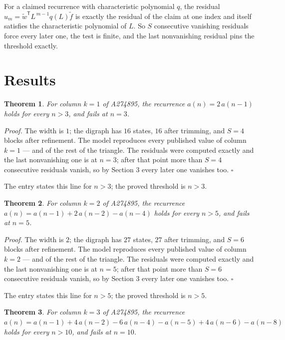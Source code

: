 \documentclass[11pt]{article}
\newtheorem{theorem}{Theorem}
\theoremstyle{definition}
\begin{document}
For a claimed recurrence with characteristic polynomial $q$, the residual $u_m = \tilde w^{\mathsf T}L^{\,m-1}q(L)\tilde f$ is exactly the residual of the claim at one index and itself satisfies the characteristic polynomial of $L$. So $S$ consecutive vanishing residuals force every later one, the test is finite, and the last nonvanishing residual pins the threshold exactly.

\section{Results}

\begin{theorem} For column $k = 1$ of A274895, the recurrence $a(n) = 2\,a(n-1)$ holds for every $n > 3$, and fails at $n = 3$.\end{theorem}

{\itshape Proof.} The width is $1$; the digraph has $16$ states, $16$ after trimming, and $S = 4$ blocks after refinement. The model reproduces every published value of column $k = 1$ --- and of the rest of the triangle. The residuals were computed exactly and the last nonvanishing one is at $n = 3$; after that point more than $S = 4$ consecutive residuals vanish, so by Section 3 every later one vanishes too. $\square$

The entry states this line for $n > 3$; the proved threshold is $n > 3$.

\begin{theorem} For column $k = 2$ of A274895, the recurrence $a(n) = a(n-1) + 2\,a(n-2) - a(n-4)$ holds for every $n > 5$, and fails at $n = 5$.\end{theorem}

{\itshape Proof.} The width is $2$; the digraph has $27$ states, $27$ after trimming, and $S = 6$ blocks after refinement. The model reproduces every published value of column $k = 2$ --- and of the rest of the triangle. The residuals were computed exactly and the last nonvanishing one is at $n = 5$; after that point more than $S = 6$ consecutive residuals vanish, so by Section 3 every later one vanishes too. $\square$

The entry states this line for $n > 5$; the proved threshold is $n > 5$.

\begin{theorem} For column $k = 3$ of A274895, the recurrence $a(n) = a(n-1) + 4\,a(n-2) - 6\,a(n-4) - a(n-5) + 4\,a(n-6) - a(n-8)$ holds for every $n > 10$, and fails at $n = 10$.\end{theorem}
\end{document}

